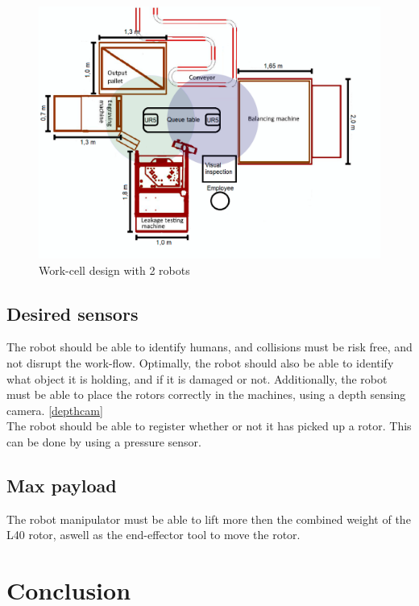 \begin{figure}[H]
    \centering
    \includegraphics[width=.5\textwidth]{Design/Work_cell_8.PNG}
    \caption{Work-cell design with 2 robots}
    \label{fig:workscell2arms}
\end{figure}



\subsection{Desired sensors}

The robot should be able to identify humans, and collisions must be risk free, and not disrupt the work-flow. Optimally, the robot should also be able to identify what object it is holding, and if it is damaged or not. Additionally, the robot must be able to place the rotors correctly in the machines, using a depth sensing camera. \ref{depthcam}\\
The robot should be able to register whether or not it has picked up a rotor. This can be done by using a pressure sensor.\\ 

\subsection{Max payload}
The robot manipulator must be able to lift more then  the combined weight of the L40 rotor, aswell as the end-effector tool to move the rotor.\\



\section{Conclusion} 

